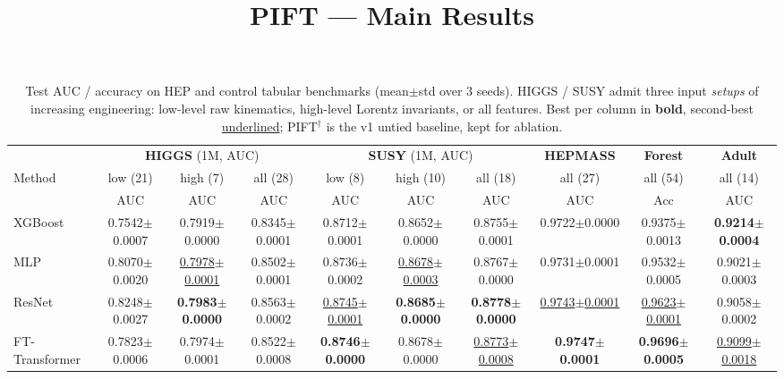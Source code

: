 \documentclass[twocolumn]{article}
\title{PIFT --- Main Results}
\date{}
\begin{document}
\maketitle

\begin{table}[t]
\centering
\caption{Test AUC / accuracy on HEP and control tabular benchmarks (mean$\pm$std over 3 seeds).
HIGGS / SUSY admit three input \emph{setups} of increasing engineering: low-level raw kinematics, high-level
Lorentz invariants, or all features.  Best per column in \textbf{bold}, second-best \underline{underlined};
PIFT$^\dagger$ is the v1 untied baseline, kept for ablation.}
\label{tab:main}
\footnotesize
\setlength{\tabcolsep}{4pt}
\begin{tabular}{l ccc ccc c c c}
\toprule
& \multicolumn{3}{c}{\textbf{HIGGS} (1M, AUC)}& \multicolumn{3}{c}{\textbf{SUSY} (1M, AUC)}& \textbf{HEPMASS} & \textbf{Forest} & \textbf{Adult} \\
\cmidrule(lr){2-4}\cmidrule(lr){5-7}\cmidrule(lr){8-8}\cmidrule(lr){9-9}\cmidrule(lr){10-10}
Method & low (21) & high (7) & all (28) & low (8) & high (10) & all (18) & all (27) & all (54) & all (14) \\
& AUC & AUC & AUC & AUC & AUC & AUC & AUC & Acc & AUC \\
\midrule
XGBoost & 0.7542{\tiny$\pm$0.0007} & 0.7919{\tiny$\pm$0.0000} & 0.8345{\tiny$\pm$0.0001} & 0.8712{\tiny$\pm$0.0001} & 0.8652{\tiny$\pm$0.0000} & 0.8755{\tiny$\pm$0.0001} & 0.9722{\tiny$\pm$0.0000} & 0.9375{\tiny$\pm$0.0013} & \textbf{0.9214{\tiny$\pm$0.0004}} \\
MLP & 0.8070{\tiny$\pm$0.0020} & \underline{0.7978{\tiny$\pm$0.0001}} & 0.8502{\tiny$\pm$0.0001} & 0.8736{\tiny$\pm$0.0002} & \underline{0.8678{\tiny$\pm$0.0003}} & 0.8767{\tiny$\pm$0.0000} & 0.9731{\tiny$\pm$0.0001} & 0.9532{\tiny$\pm$0.0005} & 0.9021{\tiny$\pm$0.0003} \\
ResNet & 0.8248{\tiny$\pm$0.0027} & \textbf{0.7983{\tiny$\pm$0.0000}} & 0.8563{\tiny$\pm$0.0002} & \underline{0.8745{\tiny$\pm$0.0001}} & \textbf{0.8685{\tiny$\pm$0.0000}} & \textbf{0.8778{\tiny$\pm$0.0000}} & \underline{0.9743{\tiny$\pm$0.0001}} & \underline{0.9623{\tiny$\pm$0.0001}} & 0.9058{\tiny$\pm$0.0002} \\
FT-Transformer & 0.7823{\tiny$\pm$0.0006} & 0.7974{\tiny$\pm$0.0001} & 0.8522{\tiny$\pm$0.0008} & \textbf{0.8746{\tiny$\pm$0.0000}} & 0.8678{\tiny$\pm$0.0000} & \underline{0.8773{\tiny$\pm$0.0008}} & \textbf{0.9747{\tiny$\pm$0.0001}} & \textbf{0.9696{\tiny$\pm$0.0005}} & \underline{0.9099{\tiny$\pm$0.0018}} \\

\end{tabular}
\end{table}
\end{document}
